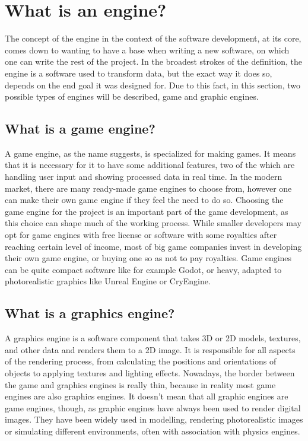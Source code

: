 \newpage
\section{What is an engine?}
\hspace{\parindent}
The concept of the engine in the context of the software development, at its core, comes down to wanting to have a base when writing a new software, on which one can write the rest of the project. In the broadest strokes of the definition, the engine is a software used to transform data, but the exact way it does so, depends on the end goal it was designed for. Due to this fact, in this section, two possible types of engines will be described, game and graphic engines.

\subsection{What is a game engine?}
\hspace{\parindent}
A game engine, as the name suggests, is specialized for making games. It means that it is necessary for it to have some additional features, two of the which are handling user input and showing processed data in real time. In the modern market, there are many ready-made game engines to choose from, however one can make their own game engine if they feel the need to do so. Choosing the game engine for the project is an important part of the game development, as this choice can shape much of the working process. While smaller developers may opt for game engines with free license or software with some royalties after reaching certain level of income, most of big game companies invest in developing their own game engine, or buying one so as not to pay royalties. Game engines can be quite compact software like for example Godot, or heavy, adapted to photorealistic graphics like Unreal Engine or CryEngine.

\subsection{What is a graphics engine?}
\hspace{\parindent}
A graphics engine is a software component that takes 3D or 2D models, textures, and other data and renders them to a 2D image. It is responsible for all aspects of the rendering process, from calculating the positions and orientations of objects to applying textures and lighting effects. Nowadays, the border between the game and graphics engines is really thin, because in reality most game engines are also graphics engines. It doesn't mean that all graphic engines are game engines, though, as graphic engines have always been used to render digital images. They have been widely used in modelling, rendering photorealistic images or simulating different environments, often with association with physics engines. 
